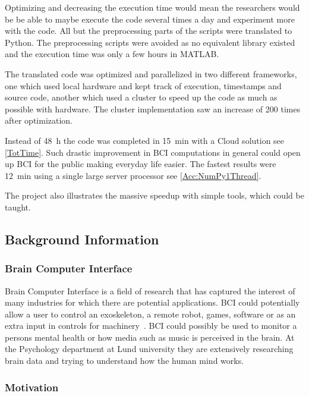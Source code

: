 \documentclass[12pt, a4paper]{article}
\begin{document}
Optimizing and decreasing the execution time would mean the researchers would be be able to maybe execute the code several times a day and experiment more with the code.
All but the preprocessing parts of the scripts were translated to Python.
The preprocessing scripts were avoided as no equivalent library existed and the execution time was only a few hours in MATLAB.

The translated code was optimized and parallelized in two different frameworks, one which used local hardware and kept track of execution, timestamps and source code, another which used a cluster to speed up the code as much as possible with hardware.
The cluster implementation saw an increase of 200 times after optimization.

Instead of \SI{48}{\hour} the code was completed in \SI{15}{\minute} with a Cloud solution see \cref{TotTime}.
Such drastic improvement in BCI computations in general could open up BCI for the public making everyday life easier.
The fastest results were \SI{12}{\minute} using a single large server processor see \cref{Acc:NumPy1Thread}.

The project also illustrates the massive speedup with simple tools, which could be taught.


\subsection{Background Information}

\subsubsection{Brain Computer Interface}

Brain Computer Interface is a field of research that has captured the interest of many industries for which there are potential applications.
BCI could potentially allow a user to control an exoskeleton, a remote robot, games, software or as an extra input in controls for machinery~\cite{10.3389/fnins.2010.00198}.
BCI could possibly be used to monitor a persons mental health or how media such as music is perceived in the brain.
At the Psychology department at Lund university they are extensively researching brain data and trying to understand how the human mind works.

\subsubsection{Motivation}
\end{document}
